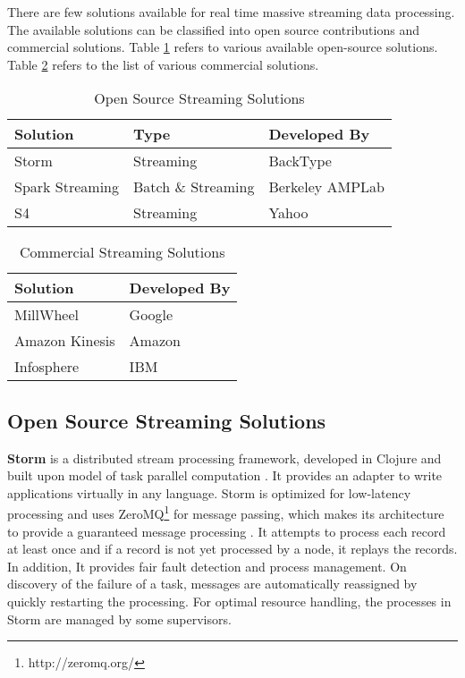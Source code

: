 \documentclass{acm_proc_article-sp}
\begin{document}
There are few solutions available for real time massive streaming data processing. The available solutions can be classified into open source contributions and commercial solutions. Table \ref{table:kysymys} refers to various available open-source solutions. Table \ref{table:propStream} refers to the list of various commercial solutions. 



\def\arraystretch{1.2}\begin{table}
\centering
\caption{Open Source Streaming Solutions}
\begin{tabular}{|l|l|l|} \hline Solution&Type&Developed By\\ \hline

Storm & Streaming & BackType\\ \hline
Spark Streaming & Batch \& Streaming & Berkeley AMPLab  \\ \hline
S4 & Streaming & Yahoo \\  
\hline\end{tabular}
\label{table:kysymys}
\end{table}

\def\arraystretch{1.2}\begin{table}
\centering
\caption{Commercial Streaming Solutions}
\begin{tabular}{|l|l|} \hline Solution&Developed By\\ \hline

MillWheel &  Google  \\ \hline
Amazon Kinesis &  Amazon\\ \hline
Infosphere &  IBM  \\ \hline
\end{tabular}
\label{table:propStream}
\end{table}

\subsection{Open Source Streaming Solutions}


\textbf{Storm} is a distributed stream processing framework, developed in Clojure and built upon model of task parallel computation  \cite{ApacheStorm}. It provides an adapter to write applications  virtually in any language. Storm is optimized for low-latency processing and uses ZeroMQ\footnote{http://zeromq.org/} for message passing, which makes its architecture to provide a guaranteed message processing \cite{ApacheStorm}. It attempts to process each record at least once and if a record is not yet processed by a node, it replays the records. In addition, It provides fair fault detection and process management. On discovery of the failure of a task, messages are automatically reassigned by quickly restarting the processing. For optimal resource handling, the processes in Storm are managed by some supervisors. 
\end{document}

